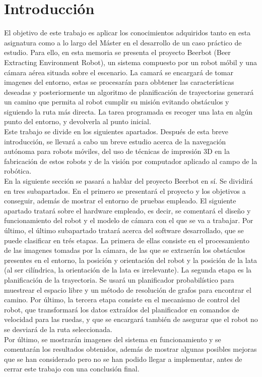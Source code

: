 \chapter{Introducción}
\label{introducción}

El objetivo de este trabajo es aplicar los conocimientos adquiridos tanto en esta asignatura como a lo largo del Máster en el desarrollo de un caso práctico de estudio. Para ello, en esta memoria se presenta el proyecto Beerbot (Beer Extracting Environment Robot), un sistema compuesto por un robot móbil y una cámara aérea situada sobre el escenario. La camará se encargará de tomar imagenes del entorno, estas se procesarán para obbtener las características deseadas y posteriormente un algoritmo de planificación de trayectorias generará un camino que permita al robot cumplir su misión evitando obstáculos y siguiendo la ruta más directa. La tarea programada es recoger una lata en algún punto del entorno, y devolverla al punto inicial.\\

Este trabajo se divide en los siguientes apartados. Después de esta breve introducción, se llevará a cabo un breve estudio acerca de la navegación autónoma para robots móviles, del uso de técnicas de impresión 3D en la fabricación de estos robots y de la visión por computador aplicado al campo de la robótica.\\

En la siguiente sección se pasará a hablar del proyecto Beerbot en sí. Se dividirá en tres subapartados. En el primero se presentará el proyecto y los objetivos a conseguir, además de mostrar el entorno de pruebas empleado. El siguiente apartado tratará sobre el hardware empleado, es decir, se comentará el diseño y funcionamiento del robot y el modelo de cámara con el que se va a trabajar. Por último, el último subapartado tratará acerca del software desarrollado, que se puede clasificar en trés etapas. La primera de ellas consiste en el procesamiento de las imagenes tomadas por la cámara, de las que se extraerán los obstáculos presentes en el entorno, la posición y orientación del robot y la posición de la lata (al ser cilíndrica, la orientación de la lata es irrelevante). La segunda etapa es la planificación de la trayectoria. Se usará un planificador probabilístico para muestrear el espacio libre y un método de resolución de grafos para encontrar el camino. Por último, la tercera etapa consiste en el mecanismo de control del robot, que transformará los datos extraídos del planificador en comandos de velocidad para las ruedas, y que se encargará también de asegurar que el robot no se desviará de la ruta seleccionada.\\

Por último, se mostrarán imagenes del sistema en funcionamiento y se comentarán los resultados obtenidos, además de mostrar algunas posibles mejoras que se han considerado pero no se han podido llegar a implementar, antes de cerrar este trabajo con una conclusión final.\\
